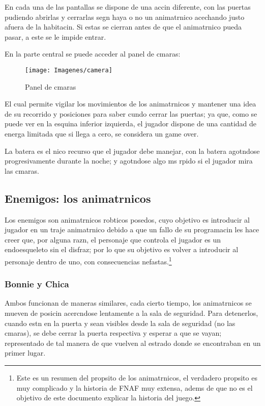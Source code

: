 \documentclass[12pt]{article}
\begin{document}
    En cada una de las pantallas se dispone de una accin diferente, con las puertas pudiendo abrirlas y cerrarlas segn haya o no un animatrnico acechando justo afuera de la habitacin. Si estas se cierran antes de que el animatrnico pueda pasar, a este se le impide entrar.

    En la parte central se puede acceder al panel de cmaras:

    \begin{figure}[H]
      \centering
      \texttt{[image: Imagenes/camera]}
      \caption[]{Panel de cmaras}
      \label{fig:camera}
    \end{figure}

    El cual permite vigilar los movimientos de los animatrnicos y mantener una idea de su recorrido y posiciones para saber cundo cerrar las puertas; ya que, como se puede ver en la esquina inferior izquierda, el jugador dispone de una cantidad de energa limitada que si llega a cero, se considera un game over.

    La batera es el nico recurso que el jugador debe manejar, con la batera agotndose progresivamente durante la noche; y agotndose algo ms rpido si el jugador mira las cmaras.

  \subsection{Enemigos: los animatrnicos}

    Los enemigos son animatrnicos robticos posedos, cuyo objetivo es introducir al jugador en un traje animatrnico debido a que un fallo de su programacin les hace creer que, por alguna razn, el personaje que controla el jugador es un endoesqueleto sin el disfraz; por lo que su objetivo es volver a introducir al personaje dentro de uno, con consecuencias nefastas.\footnote{Este es un resumen del propsito de los animatrnicos, el verdadero propsito es muy complicado y la historia de FNAF muy extensa, adems de que no es el objetivo de este documento explicar la historia del juego.}

    \subsubsection{Bonnie y Chica}
      Ambos funcionan de maneras similares, cada cierto tiempo, los animatrnicos se mueven de posicin acercndose lentamente a la sala de seguridad. Para detenerlos, cuando estn en la puerta y sean visibles desde la sala de seguridad (no las cmaras), se debe cerrar la puerta respectiva y esperar a que se vayan; representado de tal manera de que vuelven al estrado donde se encontraban en un primer lugar.
\end{document}
